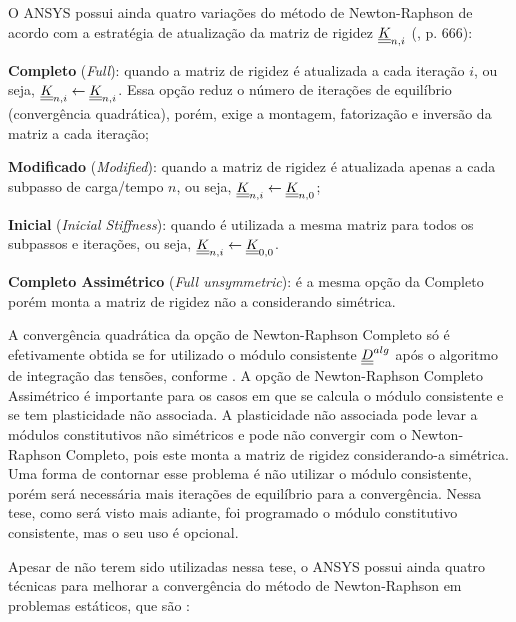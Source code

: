 O ANSYS possui ainda quatro variações do método de Newton-Raphson de acordo com a estratégia de atualização da matriz de rigidez $\underline{\underline K}_{n,i}$ (\citeyear{ANSYS2018}, p. 666): 
\begin{alineas}
	
	\item \textbf{Completo} (\textit{Full}): quando a matriz de rigidez é atualizada a cada iteração $i$, ou seja, $\underline{\underline K}_{n,i} \leftarrow \underline{\underline K}_{n,i}$. Essa opção reduz o número de iterações de equilíbrio (convergência quadrática), porém, exige a montagem, fatorização e inversão da matriz a cada iteração;
	
	\item \textbf{Modificado} (\textit{Modified}): quando a matriz de rigidez é atualizada apenas a cada subpasso de carga/tempo $n$, ou seja, $\underline{\underline K}_{n,i} \leftarrow \underline{\underline K}_{n,0}$; 
	
	\item \textbf{Inicial} (\textit{Inicial Stiffness}): quando é utilizada a mesma matriz para todos os subpassos e iterações, ou seja, $\underline{\underline K}_{n,i} \leftarrow \underline{\underline K}_{0,0}$. 
	
	\item \textbf{Completo Assimétrico} (\textit{Full unsymmetric}): é a mesma opção da Completo porém monta a matriz de rigidez não a considerando simétrica.
	
\end{alineas}

A convergência quadrática da opção de Newton-Raphson Completo só é efetivamente obtida se for utilizado o módulo consistente $\underline{\underline D}^{alg}$ após o algoritmo de integração das tensões, conforme . A opção de Newton-Raphson Completo Assimétrico é importante para os casos em que se calcula o módulo consistente e se tem plasticidade não associada. A plasticidade não associada pode levar a módulos constitutivos não simétricos e pode não convergir com o Newton-Raphson Completo, pois este monta a matriz de rigidez considerando-a simétrica. Uma forma de contornar esse problema é não utilizar o módulo consistente, porém será necessária mais iterações de equilíbrio para a convergência. Nessa tese, como será visto mais adiante, foi programado o módulo constitutivo consistente, mas o seu uso é opcional.

Apesar de não terem sido utilizadas nessa tese, o ANSYS possui ainda quatro técnicas para melhorar a convergência do método de Newton-Raphson em problemas estáticos, que são \cite[p. 668-673]{ANSYS2018}:

